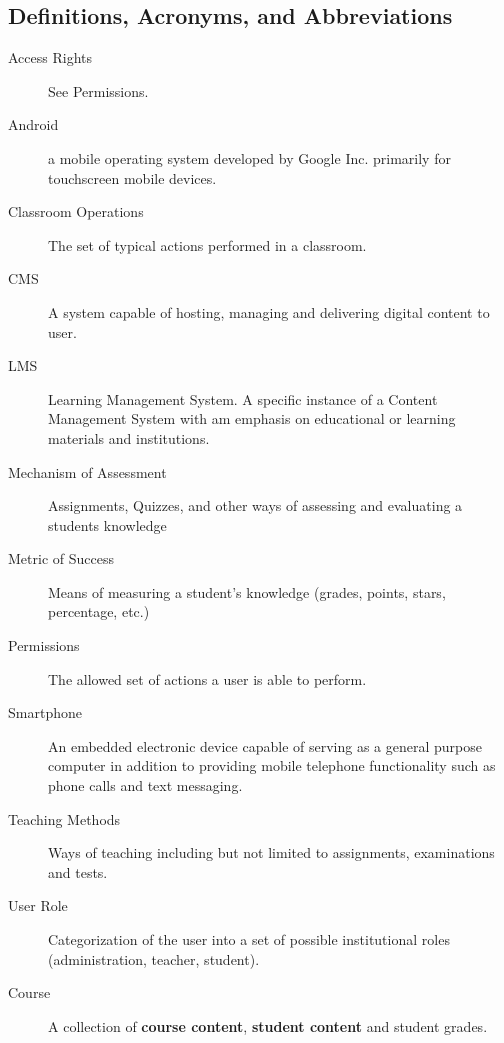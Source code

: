 \documentclass[]{article}
\begin{document}
\subsection{Definitions, Acronyms, and Abbreviations}
\label{sub:definitions_acronyms_and_abbreviations}
\begin{description}
  \item [Access Rights] See Permissions.

  \item [Android] a mobile operating system developed by Google Inc.  primarily
    for touchscreen mobile devices.

  \item [Classroom Operations] The set of typical actions performed in a
    classroom.

  \item [CMS] A system capable of hosting, managing and delivering digital
    content to user.

  \item [LMS] Learning Management System. A specific instance of a Content
    Management System with am emphasis on educational or learning materials and
    institutions.

  \item [Mechanism of Assessment] Assignments, Quizzes, and other ways of
    assessing and evaluating a students knowledge

  \item [Metric of Success] Means of measuring a student's knowledge (grades,
    points, stars, percentage, etc.)

  \item [Permissions] The allowed set of actions a user is able to perform.

  \item [Smartphone] An embedded electronic device capable of serving as a
    general purpose computer in addition to providing mobile telephone
    functionality such as phone calls and text messaging.

  \item [Teaching Methods] Ways of teaching including but not limited to
    assignments, examinations and tests.

  \item [User Role] Categorization of the user into a set of possible
    institutional roles (administration, teacher, student).

	\item [Course] A collection of \textbf{course content}, \textbf{student content} and student grades.


\end{description}
\end{document}
